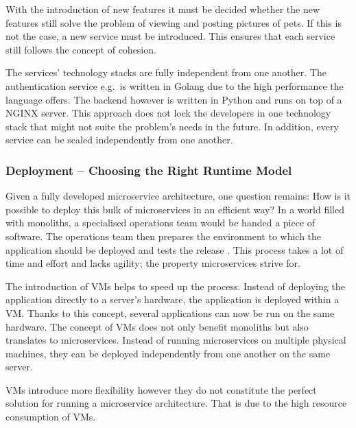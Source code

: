 With the introduction of new features it must be decided whether the new
features still solve the problem of viewing and posting pictures of pets. If
this is not the case, a new service must be introduced. This ensures that each
service still follows the concept of cohesion.

The services' technology stacks are fully independent from one another. The
authentication service e.g.\ is written in Golang due to the high performance
the language offers. The backend however is written in Python and runs on top
of a NGINX server. This approach does not lock the developers in one technology
stack that might not suite the problem's needs in the future. In addition,
every service can be scaled independently from one another.

\subsubsection{Deployment -- Choosing the Right Runtime Model}%
\label{ssub:Deployment_Runtime_Model}

Given a fully developed microservice architecture, one question remains: How is
it possible to deploy this bulk of microservices in an efficient way? In a
world filled with monoliths, a specialised operations team would be handed a
piece of software. The operations team then prepares the environment to which
the application should be deployed and tests the release
\autocite{VillamizarEvaluatingmonolithicmicroservice2015}. This process takes a
lot of time and effort and lacks agility; the property microservices strive
for.

The introduction of \acp{VM} helps to speed up the process. Instead of
deploying the application directly to a server's hardware, the application is
deployed within a \ac{VM}. Thanks to this concept, several applications can now
be run on the same hardware. The concept of \acp{VM} does not only benefit
monoliths but also translates to microservices. Instead of running
microservices on multiple physical machines, they can be deployed
independently from one another on the same server.

\acp{VM} introduce more flexibility however they do not constitute the perfect
solution for running a microservice architecture. That is due to the high
resource consumption of \acp{VM}.

